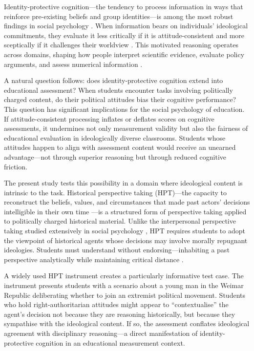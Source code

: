 \documentclass[referee,pdflatex,sn-apa]{sn-jnl}
\begin{document}
Identity-protective cognition---the tendency to process information in ways that reinforce pre-existing beliefs and group identities---is among the most robust findings in social psychology \citep{Kahan2017,Jost2003,Kunda1990}. When information bears on individuals' ideological commitments, they evaluate it less critically if it is attitude-consistent and more sceptically if it challenges their worldview \citep{LodgeTaber2013}. This motivated reasoning operates across domains, shaping how people interpret scientific evidence, evaluate policy arguments, and assess numerical information \citep{Kahan2017,Stanovich2013}.

A natural question follows: does identity-protective cognition extend into educational assessment? When students encounter tasks involving politically charged content, do their political attitudes bias their cognitive performance? This question has significant implications for the social psychology of education. If attitude-consistent processing inflates or deflates scores on cognitive assessments, it undermines not only measurement validity but also the fairness of educational evaluation in ideologically diverse classrooms. Students whose attitudes happen to align with assessment content would receive an unearned advantage---not through superior reasoning but through reduced cognitive friction.

The present study tests this possibility in a domain where ideological content is intrinsic to the task. Historical perspective taking (HPT)---the capacity to reconstruct the beliefs, values, and circumstances that made past actors' decisions intelligible in their own time \citep{Lee2001,Hartmann2008}---is a structured form of perspective taking applied to politically charged historical material. Unlike the interpersonal perspective taking studied extensively in social psychology \citep{Galinsky2005,Selman1980}, HPT requires students to adopt the viewpoint of historical agents whose decisions may involve morally repugnant ideologies. Students must understand without endorsing---inhabiting a past perspective analytically while maintaining critical distance \citep{Lee2001,Wineburg2001}.

A widely used HPT instrument \citep{Hartmann2008} creates a particularly informative test case. The instrument presents students with a scenario about a young man in the Weimar Republic deliberating whether to join an extremist political movement. Students who hold right-authoritarian attitudes might appear to ``contextualise'' the agent's decision not because they are reasoning historically, but because they sympathise with the ideological content. If so, the assessment conflates ideological agreement with disciplinary reasoning---a direct manifestation of identity-protective cognition in an educational measurement context.
\end{document}
